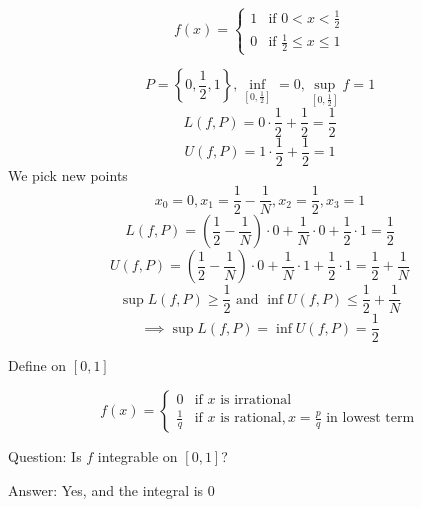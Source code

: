 \begin{example*}
\[
  f(x) = \begin{cases}
    1 & \text{if } 0 < x < \frac{1}{2}\\
    0 & \text{if } \frac{1}{2} \leq x \leq 1
    \end{cases}
\] 

$$P = \left\{0, \frac{1}{2}, 1\right\}, \inf_{[0, \frac{1}{2}]} = 0, \sup_{[0, \frac{1}{2}]} f = 1$$
$$L(f, P) = 0\cdot\frac{1}{2} + \frac{1}{2} = \frac{1}{2}$$
$$U(f, P) = 1\cdot\frac{1}{2} + \frac{1}{2} = 1$$
We pick new points
$$x_0 = 0, x_1 = \frac{1}{2} - \frac{1}{N}, x_2 = \frac{1}{2}, x_3 = 1$$
$$L(f, P) = \left(\frac{1}{2} - \frac{1}{N}\right)\cdot 0 + \frac{1}{N}\cdot 0 + \frac{1}{2}\cdot 1 = \frac{1}{2}$$
$$U(f, P) = \left(\frac{1}{2} - \frac{1}{N}\right)\cdot 0 + \frac{1}{N}\cdot 1 + \frac{1}{2}\cdot 1 = \frac{1}{2} + \frac{1}{N}$$
$$\sup L(f, P) \ge \frac{1}{2}\text{ and } \inf U(f, P) \le \frac{1}{2} + \frac{1}{N}$$
$$\implies \sup L(f, P) = \inf U(f, P) = \frac{1}{2}$$
\end{example*}

\begin{example*}
  Define on $[0, 1]$

\[
  f(x) = \begin{cases}
    0 & \text{if } x \text{ is irrational}\\
    \frac{1}{q} & \text{if } x \text{ is rational}, x = \frac{p}{q}\text{ in lowest term}
    \end{cases}
\]

Question: Is $f$ integrable on $[0, 1]$?

Answer: Yes, and the integral is $0$
\end{example*}